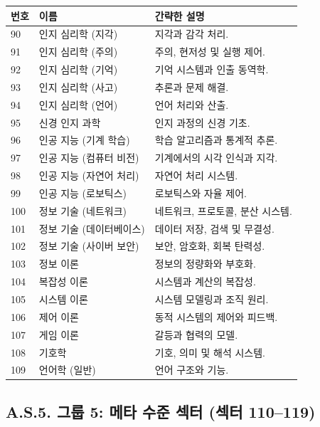 \documentclass[13pt,a4paper]{article}
\begin{document}
	\begin{longtable}{|p{0.9cm}|p{6.0cm}|p{8.6cm}|}
		\hline
		\textbf{번호} & \textbf{이름} & \textbf{간략한 설명} \\
		\hline
		\endhead
		90 & 인지 심리학 (지각) & 지각과 감각 처리. \\
		\hline
		91 & 인지 심리학 (주의) & 주의, 현저성 및 실행 제어. \\
		\hline
		92 & 인지 심리학 (기억) & 기억 시스템과 인출 동역학. \\
		\hline
		93 & 인지 심리학 (사고) & 추론과 문제 해결. \\
		\hline
		94 & 인지 심리학 (언어) & 언어 처리와 산출. \\
		\hline
		95 & 신경 인지 과학 & 인지 과정의 신경 기초. \\
		\hline
		96 & 인공 지능 (기계 학습) & 학습 알고리즘과 통계적 추론. \\
		\hline
		97 & 인공 지능 (컴퓨터 비전) & 기계에서의 시각 인식과 지각. \\
		\hline
		98 & 인공 지능 (자연어 처리) & 자연어 처리 시스템. \\
		\hline
		99 & 인공 지능 (로보틱스) & 로보틱스와 자율 제어. \\
		\hline
		100 & 정보 기술 (네트워크) & 네트워크, 프로토콜, 분산 시스템. \\
		\hline
		101 & 정보 기술 (데이터베이스) & 데이터 저장, 검색 및 무결성. \\
		\hline
		102 & 정보 기술 (사이버 보안) & 보안, 암호화, 회복 탄력성. \\
		\hline
		103 & 정보 이론 & 정보의 정량화와 부호화. \\
		\hline
		104 & 복잡성 이론 & 시스템과 계산의 복잡성. \\
		\hline
		105 & 시스템 이론 & 시스템 모델링과 조직 원리. \\
		\hline
		106 & 제어 이론 & 동적 시스템의 제어와 피드백. \\
		\hline
		107 & 게임 이론 & 갈등과 협력의 모델. \\
		\hline
		108 & 기호학 & 기호, 의미 및 해석 시스템. \\
		\hline
		109 & 언어학 (일반) & 언어 구조와 기능. \\
		\hline
	\end{longtable}
	
	\subsection*{A.S.5. 그룹 5: 메타 수준 섹터 (섹터 110--119)}
	
\end{document}
